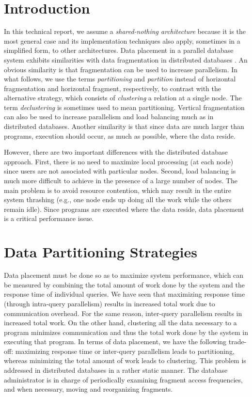 \documentclass{vldb}
\begin{document}
\section{Introduction}
In this technical report, we assume a \textit{shared-nothing architecture} because it is the most general case and its implementation techniques also apply, sometimes in a simplified form, to other architectures. Data placement in a parallel database system exhibits similarities with data fragmentation in distributed databases \cite{zsu:2011}. An obvious similarity is that fragmentation can be used to increase parallelism. 
In what follows, we use the terms \textit{partitioning} and \textit{partition} instead of horizontal fragmentation and horizontal fragment, respectively, to contrast with the alternative strategy, which consists of \textit{clustering} a relation at a single node. 
The term \textit{declustering} is sometimes used to mean partitioning. 
Vertical fragmentation can also be used to increase parallelism and load balancing much as in distributed databases. Another similarity is that since data are much larger than programs, execution should occur, as much as possible, where the data reside. 

However, there are two important differences with the distributed database approach. First, there is no need to maximize local processing (at each node) since users are not associated with particular nodes. Second, load balancing is much more difficult to achieve in the presence of a large number of nodes. The main problem is to avoid resource contention, which may result in the entire system thrashing (e.g., one node ends up doing all the work while the others remain idle). Since programs are executed where the data reside, data placement is a critical performance issue.

\section{Data Partitioning Strategies}

Data placement must be done so as to maximize system performance, which can be measured by combining the total amount of work done by the system and the response time of individual queries. We have seen that maximizing response time (through intra-query parallelism) results in increased total work due to communication overhead. For the same reason, inter-query parallelism results in increased total work. On the other hand, clustering all the data necessary to a program minimizes communication and thus the total work done by the system in executing that program. In terms of data placement, we have the following trade-off: maximizing response time or inter-query parallelism leads to partitioning, whereas minimizing the total amount of work leads to clustering. This problem is addressed in distributed databases in a rather static manner. The database administrator is in charge of periodically examining fragment access frequencies, and when necessary, moving and reorganizing fragments.
\end{document}
